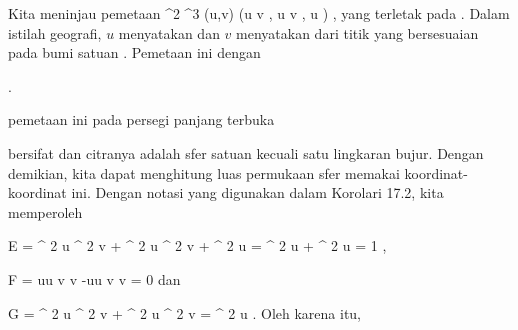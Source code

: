 {

Kita meninjau pemetaan
\maabbeledisp {\varphi} {\R^2} {\R^3
} {(u,v)} {(\cos  u \cos  v  , \cos  u \sin  v  , \sin  u )
} {,}
yang
terletak pada  {.} Dalam istilah geografi, $u$ menyatakan  {} dan $v$ menyatakan  {} dari titik yang bersesuaian pada bumi satuan
 {} {.}
Pemetaan ini
dengan

 { . }

pemetaan ini pada persegi panjang terbuka

\mathdisp {{]{- { \frac{   \pi }{  2 } }}, { \frac{   \pi }{  2 } } [} \times {]{-\pi}, \pi[}} {  }

bersifat
dan citranya adalah sfer satuan kecuali satu lingkaran bujur. Dengan demikian, kita dapat menghitung luas permukaan sfer memakai koordinat-koordinat ini. Dengan notasi yang digunakan dalam
Korolari 17.2,
kita memperoleh

\mavergleichskettedisp
{\vergleichskette
{E
}
{ =} { \sin^{ 2  }  u \cos^{ 2  }  v + \sin^{ 2  }  u \sin^{ 2  }  v + \cos^{ 2  }  u
}
{ =} { \sin^{ 2  }  u + \cos^{ 2  }  u
}
{ =} { 1
}
{ } {
}
}
{}{}{,}

\mavergleichskettedisp
{\vergleichskette
{F
}
{ =} { \sin  u\cos  u \sin  v \cos  v  -\sin  u\cos  u \sin  v \cos  v
}
{ =} { 0
}
{ } {
}
{ } {
}
}
{}{}{}
dan

\mavergleichskettedisp
{\vergleichskette
{G
}
{ =} { \cos^{ 2  }  u \sin^{ 2  }  v + \cos^{ 2  }  u \cos^{ 2  }  v
}
{ =} { \cos^{ 2  }  u
}
{ } {
}
{ } {
}
}
{}{}{.}
Oleh karena itu,

}
